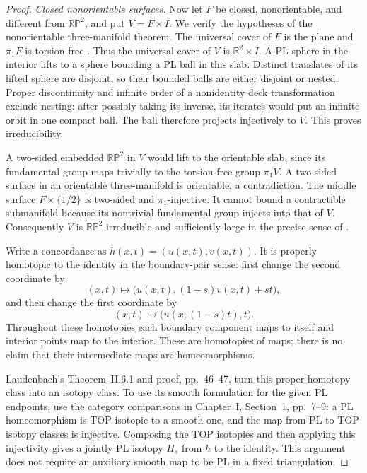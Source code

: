 \begin{proof}
\emph{Closed nonorientable surfaces.}
Now let $F$ be closed, nonorientable, and different from
$\mathbb{RP}^2$, and put $V=F\times I$.
We verify the hypotheses of the nonorientable three-manifold theorem.
The universal cover of $F$ is the plane and $\pi_1F$ is torsion free
\cite[Corollary~1.8, pp.~85--86; Lemma~4.3, p.~92]{Epstein1966}.
Thus the universal cover of $V$ is $\mathbb R^2\times I$.
A PL sphere in the interior lifts to a sphere bounding a PL ball in
this slab.  Distinct translates of its lifted sphere are disjoint,
so their bounded balls are either disjoint or nested.  Proper
discontinuity and infinite order of a nonidentity deck transformation
exclude nesting: after possibly taking its inverse, its iterates would
put an infinite orbit in one compact ball.  The ball therefore projects
injectively to $V$.  This proves irreducibility.

A two-sided embedded $\mathbb{RP}^2$ in $V$ would lift to the
orientable slab, since its fundamental group maps trivially to the
torsion-free group $\pi_1V$.  A two-sided surface in an orientable
three-manifold is orientable, a contradiction.
The middle surface $F\times\{1/2\}$ is two-sided and
$\pi_1$-injective.  It cannot bound a contractible submanifold because
its nontrivial fundamental group injects into that of $V$.
Consequently $V$ is $\mathbb{RP}^2$-irreducible and sufficiently large
in the precise sense of
\cite[Chapter~II, Definitions~1.2--1.5, pp.~15--17]{Laudenbach1974}.

Write a concordance as $h(x,t)=(u(x,t),v(x,t))$.  It is properly
homotopic to the identity in the boundary-pair sense: first change the
second coordinate by
\[
             (x,t)\longmapsto
             \bigl(u(x,t),(1-s)v(x,t)+st\bigr),
\]
and then change the first coordinate by
\[
             (x,t)\longmapsto\bigl(u(x,(1-s)t),t\bigr).
\]
Throughout these homotopies each boundary component maps to itself and
interior points map to the interior.  These are homotopies of maps;
there is no claim that their intermediate maps are homeomorphisms.

Laudenbach's Theorem~II.6.1 and proof, pp.~46--47, turn this proper
homotopy class into an isotopy class.  To use its smooth formulation
for the given PL endpoints, use the category comparisons in
Chapter~I, Section~1, pp.~7--9: a PL homeomorphism is TOP isotopic to
a smooth one, and the map from PL to TOP isotopy classes is
injective.  Composing the TOP isotopies and then applying this
injectivity gives a jointly PL isotopy $H_s$ from $h$ to the identity.
This argument does not require an auxiliary smooth map to be PL in a
fixed triangulation.


\end{proof}
